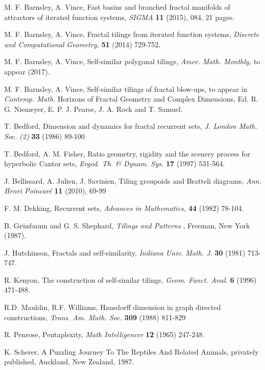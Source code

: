 \documentclass{amsproc}
\theoremstyle{plain}
\theoremstyle{definition}
\numberwithin{equation}{section}
\begin{document}
\begin{thebibliography}{99}
 M. F. Barnsley, A. Vince, Fast basins and branched
fractal manifolds of attractors of iterated function systems, \textit{SIGMA }%
\textbf{11} (2015), 084, 21 pages.

 M. F. Barnsley, A. Vince, Fractal tilings from iterated
function systems, \textit{Discrete and Computational Geometry, }\textbf{51}
(2014) 729-752.

 M. F. Barnsley, A. Vince, Self-similar polygonal tilings, 
\textit{Amer. Math. Monthly, }to appear (2017).

 M. F. Barnsley, A. Vince, Self-similar tilings of
fractal blow-ups, to appear in \textit{Contemp. Math. }Horizons of Fractal
Geometry and Complex Dimensions, Ed. R. G. Niemeyer, E. P. J. Pearse, J. A.
Rock and T. Samuel.

 T. Bedford, Dimension and dynamics for fractal
recurrent sets, \textit{J. London Math. Soc. (2) }\textbf{33 }(1986) 89-100

 T. Bedford, A. M. Fisher, Ratio geometry, rigidity
and the scenery process for hyperbolic Cantor sets, \textit{Ergod. Th. \&
Dynam. Sys. }\textbf{17 }(1997) 531-564.

 J. Bellissard, A. Julien, J. Savinien, Tiling groupoids
and Bratteli diagrams, \textit{Ann. Henri Poincar\'{e} }\textbf{11} (2010),
69-99

 F. M. Dekking, Recurrent sets, \textit{Advances in
Mathematics, }\textbf{44 }(1982) 78-104.

 B. Gr\"{u}nbaum and G. S. Shephard, \textit{Tilings and Patterns}%
, Freeman, New York (1987).

 J. Hutchinson, Fractals and self-similarity, \textit{%
Indiana Univ. Math. J}. \textbf{30} (1981) 713-747.

 R. Kenyon, The construction of self-similar tilings, \textit{%
Geom. Funct. Anal.} \textbf{6} (1996) 471-488.

 R.D. Mauldin, R.F. Williams, Hausdorff dimension in graph
directed constructions, \textit{Trans. Am. Math. Soc. }\textbf{309} (1988)
811-829

 R. Penrose, Pentaplexity, \textit{Math Intelligencer} \textbf{%
12} (1965) 247-248.

 K. Scherer, A Puzzling Journey To The Reptiles And Related
Animals, privately published, Auckland, New Zealand, 1987.


\end{thebibliography}
\end{document}
